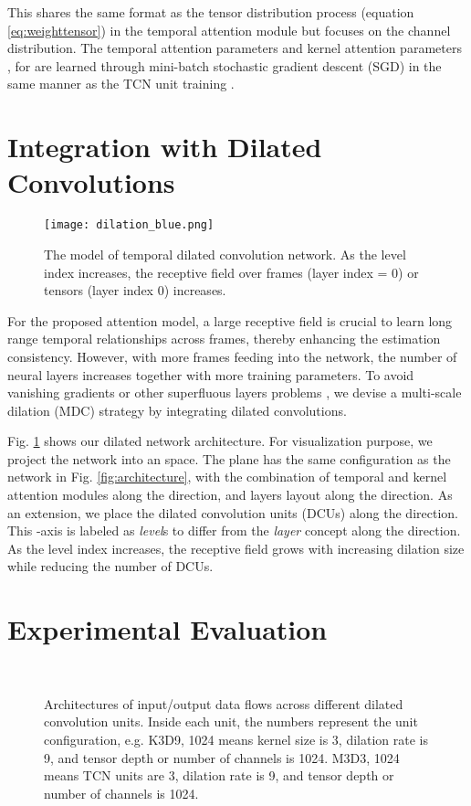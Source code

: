 \documentclass[twocolumn]{svjour3}          \smartqed  \usepackage{graphicx}
\begin{document}
This shares the same format as the tensor distribution process (equation \ref{eq:weighttensor}) in the temporal attention module but focuses on the channel distribution. The temporal attention parameters  and kernel attention parameters ,  for  are learned through mini-batch stochastic gradient descent (SGD) in the same manner as the TCN unit training \citep{bottou2010large}.

\section{Integration with Dilated Convolutions}\label{dilation}

\begin{figure}[]
  \texttt{[image: dilation\_blue.png]}
  \caption{The model of temporal dilated convolution network. As the level index increases, the receptive field over frames (layer index = 0) or tensors (layer index   0) increases.  }
\label{fig:3Ddilation}
\end{figure}

For the proposed attention model, a large receptive field is crucial to learn long range temporal relationships across frames, thereby enhancing the estimation consistency. However, with more frames feeding into the network, the number of neural layers increases together with more training parameters. To avoid vanishing gradients or other superfluous layers problems \citep{Martinez2017}, we devise a multi-scale dilation (MDC) strategy by integrating dilated convolutions. 

Fig. \ref{fig:3Ddilation} shows our dilated network architecture. For visualization purpose, we project the network into an  space.  The  plane has the same configuration as the network in
 Fig. \ref{fig:architecture}, with the combination of temporal and kernel attention modules along the  direction, and layers layout along the  direction. As an extension, we place the dilated convolution units (DCUs) along the  direction. This -axis is labeled as \emph{level}s to differ from the \emph{layer} concept along the  direction. As the level index increases, the receptive field grows with increasing dilation size while reducing the  number of DCUs.

\section{Experimental Evaluation}

\begin{figure}
\\
\caption{Architectures of input/output data flows across different dilated convolution units. Inside each unit, the numbers represent the unit configuration, e.g. K3D9, 1024 means kernel size is 3, dilation rate is 9, and tensor depth or number of channels is 1024. M3D3, 1024 means TCN units are 3, dilation rate is 9, and tensor depth or number of channels is 1024.}
\label{fig:config}
\end{figure}
\end{document}
